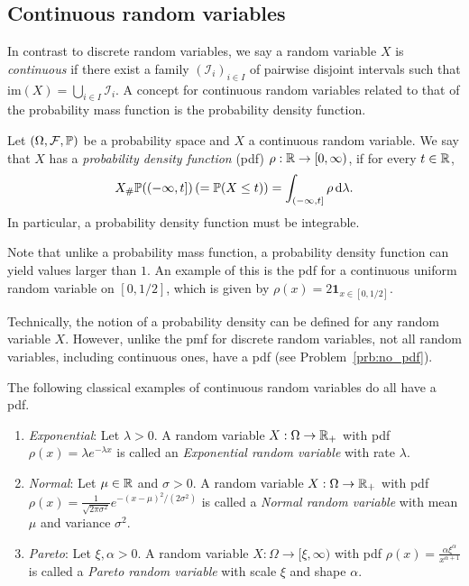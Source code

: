 \subsection{Continuous random variables}

In contrast to discrete random variables, we say a random variable $X$ is \emph{continuous} if there exist a family  $(\mathcal{I}_i)_{i \in I}$ of pairwise disjoint intervals such that $\mathrm{im}(X) = \bigcup_{i \in I} \mathcal{I}_i$.
A concept for continuous random variables related to that of the probability mass function is the probability density function. 

\begin{definition}\label{def:pdf}
Let $(\Omega, \mathcal F, \mathbb{P})$ be a probability space and $X$ a continuous random variable. We say that $X$ has a \emph{probability density function} (pdf) $\rho : \mathbb R \to [0,\infty)$, if for every $t \in \mathbb R$,
\[
	X_\# \mathbb P((-\infty , t]) \, (= \mathbb P(X \le t)) = \int_{(-\infty,t]} \rho \, \mathrm{d} \lambda.
\]
In particular, a probability density function must be integrable.
\end{definition}

Note that unlike a probability mass function, a probability density function can yield values larger than $1$. An example of this is the pdf for a continuous uniform random variable on $[0,1/2]$, which is given by $\rho(x) = 2 \mathbf{1}_{x \in [0,1/2]}$.

Technically, the notion of a probability density can be defined for any random variable $X$. However, unlike the pmf for discrete random variables, not all random variables, including continuous ones, have a pdf (see Problem~\ref{prb:no_pdf}).

The following classical examples of continuous random variables do all have a pdf.

\begin{example}\hfill
\begin{enumerate}[label=(\alph*)]
\item \textit{Exponential}: Let $\lambda > 0$. A random variable $X : \Omega \to \mathbb R_+$ with pdf $\rho(x) = \lambda e^{-\lambda x}$ is called an \emph{Exponential random variable} with rate $\lambda$.
\item \textit{Normal}: Let $\mu \in \mathbb R$ and $\sigma > 0$. A random variable $X : \Omega \to \mathbb R_+$ with pdf $\rho(x) = \frac{1}{\sqrt{2 \pi \sigma^2}} e^{-(x - \mu)^2/(2\sigma^2)}$ is called a \emph{Normal random variable} with mean $\mu$ and variance $\sigma^2$.
\item \textit{Pareto}: Let $\xi, \alpha > 0$. A random variable $X : \Omega \to [\xi, \infty)$ with pdf $\rho(x) = \frac{\alpha \xi^\alpha}{x^{\alpha +1}}$ is called a \emph{Pareto random variable} with scale $\xi$ and shape $\alpha$.
\end{enumerate} 
\end{example}



